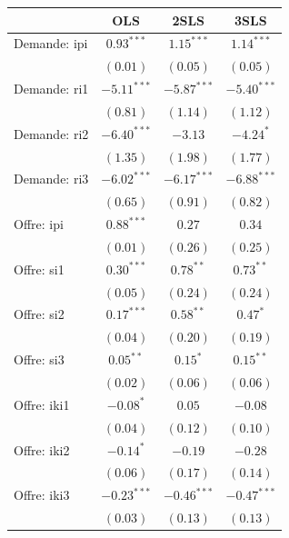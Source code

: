 \documentclass[11pt,]{article}
\begin{document}
\begin{table}
\begin{center}
\begin{tabular}{l c c c }
\hline
 & OLS & 2SLS & 3SLS \\
\hline
Demande: ipi        & $0.93^{***}$  & $1.15^{***}$  & $1.14^{***}$  \\
                    & $(0.01)$      & $(0.05)$      & $(0.05)$      \\
Demande: ri1        & $-5.11^{***}$ & $-5.87^{***}$ & $-5.40^{***}$ \\
                    & $(0.81)$      & $(1.14)$      & $(1.12)$      \\
Demande: ri2        & $-6.40^{***}$ & $-3.13$       & $-4.24^{*}$   \\
                    & $(1.35)$      & $(1.98)$      & $(1.77)$      \\
Demande: ri3        & $-6.02^{***}$ & $-6.17^{***}$ & $-6.88^{***}$ \\
                    & $(0.65)$      & $(0.91)$      & $(0.82)$      \\
Offre: ipi          & $0.88^{***}$  & $0.27$        & $0.34$        \\
                    & $(0.01)$      & $(0.26)$      & $(0.25)$      \\
Offre: si1          & $0.30^{***}$  & $0.78^{**}$   & $0.73^{**}$   \\
                    & $(0.05)$      & $(0.24)$      & $(0.24)$      \\
Offre: si2          & $0.17^{***}$  & $0.58^{**}$   & $0.47^{*}$    \\
                    & $(0.04)$      & $(0.20)$      & $(0.19)$      \\
Offre: si3          & $0.05^{**}$   & $0.15^{*}$    & $0.15^{**}$   \\
                    & $(0.02)$      & $(0.06)$      & $(0.06)$      \\
Offre: iki1         & $-0.08^{*}$   & $0.05$        & $-0.08$       \\
                    & $(0.04)$      & $(0.12)$      & $(0.10)$      \\
Offre: iki2         & $-0.14^{*}$   & $-0.19$       & $-0.28$       \\
                    & $(0.06)$      & $(0.17)$      & $(0.14)$      \\
Offre: iki3         & $-0.23^{***}$ & $-0.46^{***}$ & $-0.47^{***}$ \\
                    & $(0.03)$      & $(0.13)$      & $(0.13)$      \\

\end{tabular}
\end{center}
\end{table}
\end{document}
